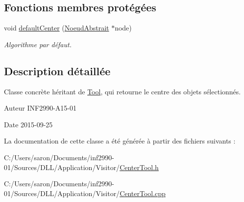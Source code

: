 \subsection*{Fonctions membres protégées}
\begin{DoxyCompactItemize}
\item 
void \hyperlink{group__inf2990_gab64cc9d2d491c0bd04a1efc4756740df}{default\-Center} (\hyperlink{class_noeud_abstrait}{Noeud\-Abstrait} $\ast$node)
\begin{DoxyCompactList}\small\item\em Algorithme par défaut. \end{DoxyCompactList}\end{DoxyCompactItemize}


\subsection{Description détaillée}
Classe concrète héritant de \hyperlink{class_tool}{Tool}, qui retourne le centre des objets sélectionnés. 

\begin{DoxyAuthor}{Auteur}
I\-N\-F2990-\/\-A15-\/01 
\end{DoxyAuthor}
\begin{DoxyDate}{Date}
2015-\/09-\/25 
\end{DoxyDate}


La documentation de cette classe a été générée à partir des fichiers suivants \-:\begin{DoxyCompactItemize}
\item 
C\-:/\-Users/saron/\-Documents/inf2990-\/01/\-Sources/\-D\-L\-L/\-Application/\-Visitor/\hyperlink{_center_tool_8h}{Center\-Tool.\-h}\item 
C\-:/\-Users/saron/\-Documents/inf2990-\/01/\-Sources/\-D\-L\-L/\-Application/\-Visitor/\hyperlink{_center_tool_8cpp}{Center\-Tool.\-cpp}\end{DoxyCompactItemize}
